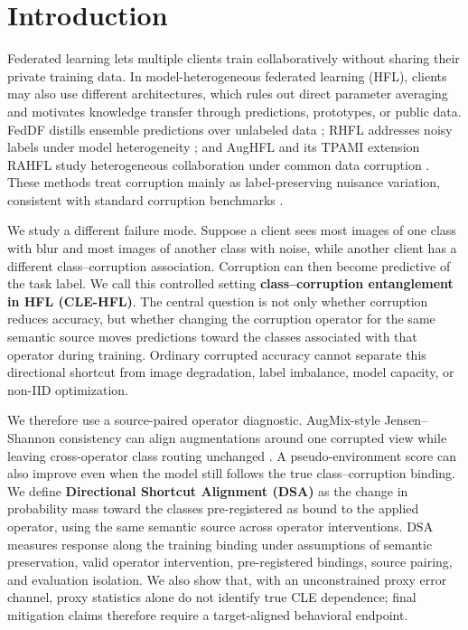 \section{Introduction}

Federated learning lets multiple clients train collaboratively without sharing their private training data. In model-heterogeneous federated learning (HFL), clients may also use different architectures, which rules out direct parameter averaging and motivates knowledge transfer through predictions, prototypes, or public data. FedDF distills ensemble predictions over unlabeled data \citep{lin2020feddf}; RHFL addresses noisy labels under model heterogeneity \citep{fang2022rhfl}; and AugHFL and its TPAMI extension RAHFL study heterogeneous collaboration under common data corruption \citep{fang2023aughfl,fang2025rahfl}. These methods treat corruption mainly as label-preserving nuisance variation, consistent with standard corruption benchmarks \citep{hendrycks2019corruptions,cubuk2020augmix}.

We study a different failure mode. Suppose a client sees most images of one class with blur and most images of another class with noise, while another client has a different class--corruption association. Corruption can then become predictive of the task label. We call this controlled setting \textbf{class--corruption entanglement in HFL (CLE-HFL)}. The central question is not only whether corruption reduces accuracy, but whether changing the corruption operator for the same semantic source moves predictions toward the classes associated with that operator during training. Ordinary corrupted accuracy cannot separate this directional shortcut from image degradation, label imbalance, model capacity, or non-IID optimization.

We therefore use a source-paired operator diagnostic. AugMix-style Jensen--Shannon consistency can align augmentations around one corrupted view while leaving cross-operator class routing unchanged \citep{cubuk2020augmix}. A pseudo-environment score can also improve even when the model still follows the true class--corruption binding. We define \textbf{Directional Shortcut Alignment (DSA)} as the change in probability mass toward the classes pre-registered as bound to the applied operator, using the same semantic source across operator interventions. DSA measures response along the training binding under assumptions of semantic preservation, valid operator intervention, pre-registered bindings, source pairing, and evaluation isolation. We also show that, with an unconstrained proxy error channel, proxy statistics alone do not identify true CLE dependence; final mitigation claims therefore require a target-aligned behavioral endpoint.

